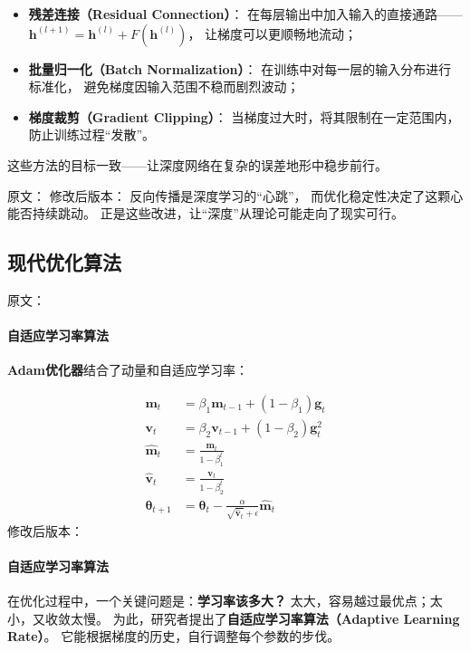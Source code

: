 \begin{itemize}
\item \textbf{残差连接（Residual Connection）}：  
在每层输出中加入输入的直接通路——$\mathbf{h}^{(l+1)} = \mathbf{h}^{(l)} + F(\mathbf{h}^{(l)})$，  
让梯度可以更顺畅地流动；
\item \textbf{批量归一化（Batch Normalization）}：  
在训练中对每一层的输入分布进行标准化，  
避免梯度因输入范围不稳而剧烈波动；
\item \textbf{梯度裁剪（Gradient Clipping）}：  
当梯度过大时，将其限制在一定范围内，  
防止训练过程“发散”。
\end{itemize}

这些方法的目标一致——让深度网络在复杂的误差地形中稳步前行。



原文：
修改后版本：
反向传播是深度学习的“心跳”，  
而优化稳定性决定了这颗心能否持续跳动。  
正是这些改进，让“深度”从理论可能走向了现实可行。

\subsection{现代优化算法}

原文：
\paragraph{自适应学习率算法}

\textbf{Adam优化器}结合了动量和自适应学习率：

\begin{align}
\mathbf{m}_t &= \beta_1 \mathbf{m}_{t-1} + (1-\beta_1) \mathbf{g}_t \\
\mathbf{v}_t &= \beta_2 \mathbf{v}_{t-1} + (1-\beta_2) \mathbf{g}_t^2 \\
\hat{\mathbf{m}}_t &= \frac{\mathbf{m}_t}{1-\beta_1^t} \\
\hat{\mathbf{v}}_t &= \frac{\mathbf{v}_t}{1-\beta_2^t} \\
\boldsymbol{\theta}_{t+1} &= \boldsymbol{\theta}_t - \frac{\alpha}{\sqrt{\hat{\mathbf{v}}_t} + \epsilon} \hat{\mathbf{m}}_t
\end{align}
修改后版本：
\paragraph{自适应学习率算法}  
在优化过程中，一个关键问题是：\textbf{学习率该多大？}  
太大，容易越过最优点；太小，又收敛太慢。  
为此，研究者提出了\textbf{自适应学习率算法（Adaptive Learning Rate）}。  
它能根据梯度的历史，自行调整每个参数的步伐。  

